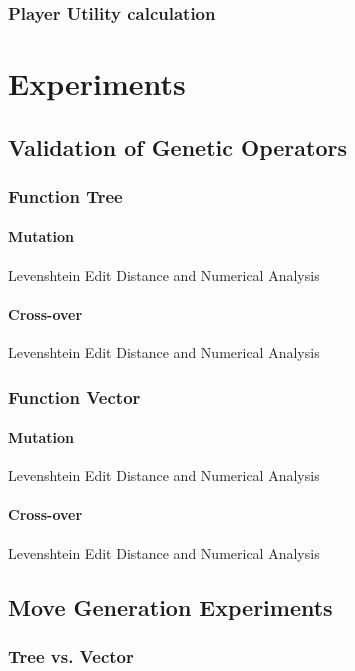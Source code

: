\documentclass{acm_proc_article-sp}
\begin{document}
        \subsubsection{Player Utility calculation}
        
            
\section{Experiments}

    \subsection{Validation of Genetic Operators}
        \subsubsection{Function Tree}
            \paragraph{Mutation}
                Levenshtein Edit Distance and Numerical Analysis
            \paragraph{Cross-over}
                Levenshtein Edit Distance and Numerical Analysis
        \subsubsection{Function Vector}
            \paragraph{Mutation}
                Levenshtein Edit Distance and Numerical Analysis
            \paragraph{Cross-over}
                Levenshtein Edit Distance and Numerical Analysis
    
    \subsection{Move Generation Experiments}
    
        \subsubsection{Tree vs. Vector}
\end{document}
